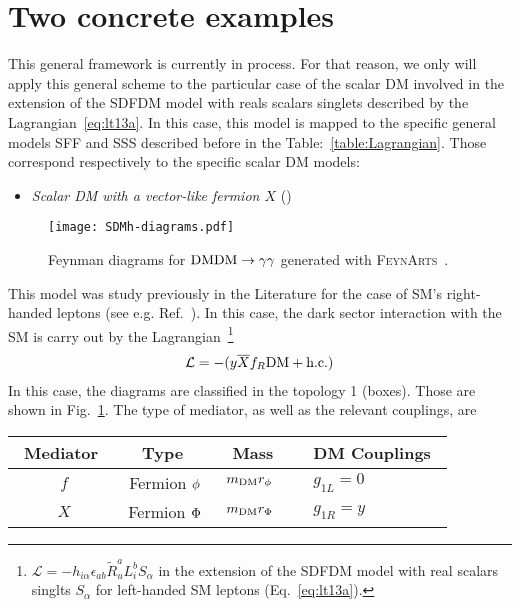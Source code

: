 \section{Two concrete examples}
\label{sec:two-examples}
%
This general framework is currently in process. For that reason, we only will apply this general scheme to the particular case of the scalar DM involved in the extension of the SDFDM model with reals scalars singlets described by the Lagrangian~\ref{eq:lt13a}. In this case, this model is mapped to the specific general models SFF and SSS described before in the Table:~\ref{table:Lagrangian}.  
%
Those correspond respectively  to the specific scalar DM models:
%
%
\begin{itemize}
\item[1.]\textit{ Scalar DM with a vector-like fermion $X$} ()
\end{itemize}

\begin{figure}[h]
\centering
\texttt{[image: SDMh-diagrams.pdf]}
\caption{Feynman diagrams for $\text{DM} \text{DM} \to\gamma\gamma$ generated with \textsc{FeynArts}~\cite{Hahn:2000kx}.}
\label{fig:scalar-to-GGg}
\end{figure}

This model was study previously in the Literature for the case of SM's right-handed leptons (see e.g. Ref.~\cite{Ibarra:2014qma}). In this case, the dark sector interaction with the SM is carry out by the Lagrangian~\footnote{$\mathcal{L}=-h_{i\alpha}\epsilon_{ab}\widetilde{R}_u^aL_i^bS_{\alpha}$ in the extension of the SDFDM model with real scalars singlts $S_{\alpha}$ for left-handed SM leptons (Eq.~\eqref{eq:lt13a}).}
\begin{align}
\mathcal{L}=- (y \overline{X}f_R\text{DM} + \text{h.c.})
\end{align}
%
In this case, the diagrams are classified in the topology 1 (boxes). Those are shown in Fig.~\ref{fig:scalar-to-GGg}.
%
The type of mediator, as well as the relevant couplings, are 
\begin{table}[H]
\centering
\begin{tabular}{ccccl} \hline
%
\,\,\,Mediator \,\,\,& \,\,\,Type\,\,\,\,\, &\,\,\, Mass\,\,\, &&DM Couplings\,\,\,\\\hline
%
$f$    & Fermion ${\phi}$ & $m_{\text{DM}} r_\phi  $&& $g_{1L} = 0$\\
$X$   & Fermion ${\Phi}$  & $m_{\text{DM}} r_{\Phi}$ && $g_{1R} = y$\\%
\end{tabular}
\end{table}

